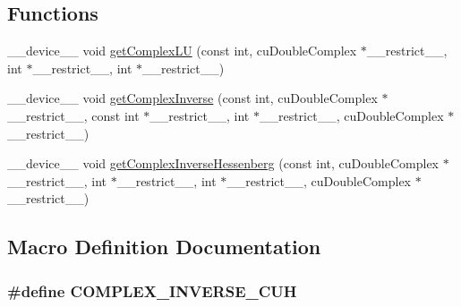 \subsection*{Functions}
\begin{DoxyCompactItemize}
\item 
\+\_\+\+\_\+device\+\_\+\+\_\+ void \hyperlink{complexInverse_8cuh_a0ad068d6b29da927683f996d74322528}{get\+Complex\+LU} (const int, cu\+Double\+Complex $\ast$\+\_\+\+\_\+restrict\+\_\+\+\_\+, int $\ast$\+\_\+\+\_\+restrict\+\_\+\+\_\+, int $\ast$\+\_\+\+\_\+restrict\+\_\+\+\_\+)
\item 
\+\_\+\+\_\+device\+\_\+\+\_\+ void \hyperlink{complexInverse_8cuh_ac15ce39b4ae91d5178d04a8f6318714a}{get\+Complex\+Inverse} (const int, cu\+Double\+Complex $\ast$\+\_\+\+\_\+restrict\+\_\+\+\_\+, const int $\ast$\+\_\+\+\_\+restrict\+\_\+\+\_\+, int $\ast$\+\_\+\+\_\+restrict\+\_\+\+\_\+, cu\+Double\+Complex $\ast$\+\_\+\+\_\+restrict\+\_\+\+\_\+)
\item 
\+\_\+\+\_\+device\+\_\+\+\_\+ void \hyperlink{complexInverse_8cuh_aaa0897f23eb6101fb0fe703ddbd93b56}{get\+Complex\+Inverse\+Hessenberg} (const int, cu\+Double\+Complex $\ast$\+\_\+\+\_\+restrict\+\_\+\+\_\+, int $\ast$\+\_\+\+\_\+restrict\+\_\+\+\_\+, int $\ast$\+\_\+\+\_\+restrict\+\_\+\+\_\+, cu\+Double\+Complex $\ast$\+\_\+\+\_\+restrict\+\_\+\+\_\+)
\end{DoxyCompactItemize}


\subsection{Macro Definition Documentation}
\subsubsection[{\texorpdfstring{C\+O\+M\+P\+L\+E\+X\+\_\+\+I\+N\+V\+E\+R\+S\+E\+\_\+\+C\+UH}{COMPLEX_INVERSE_CUH}}]{\setlength{\rightskip}{0pt plus 5cm}\#define C\+O\+M\+P\+L\+E\+X\+\_\+\+I\+N\+V\+E\+R\+S\+E\+\_\+\+C\+UH}\hypertarget{complexInverse_8cuh_a31ab82ad484c489345092056a631004d}{}\label{complexInverse_8cuh_a31ab82ad484c489345092056a631004d}


